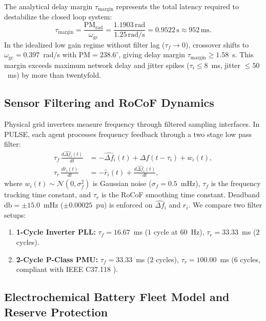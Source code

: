 \documentclass[preprint,12pt]{elsarticle}
\begin{document}
The analytical delay margin $\tau_{\mathrm{margin}}$ represents the total latency required to destabilize the closed loop system:
\begin{equation}
\tau_{\mathrm{margin}} = \frac{\mathrm{PM}_{\mathrm{rad}}}{\omega_{\mathrm{gc}}} = \frac{1.1903\,\mathrm{rad}}{1.25\,\mathrm{rad/s}} = 0.9522\,\mathrm{s} \approx 952\,\mathrm{ms}.
\label{eq:delay_margin_calc}
\end{equation}
In the idealized low gain regime without filter lag ($\tau_f \to 0$), crossover shifts to $\omega_{\mathrm{gc}} = 0.397$~rad/s with $\mathrm{PM} = 238.6^\circ$, giving delay margin $\tau_{\mathrm{margin}} \ge 1.58$~s. This margin exceeds maximum network delay and jitter spikes ($\tau_i \le 8$~ms, jitter $\le 50$~ms) by more than twentyfold.

\subsection{Sensor Filtering and RoCoF Dynamics}
\label{sec:pmu}

Physical grid inverters measure frequency through filtered sampling interfaces. In PULSE, each agent processes frequency feedback through a two stage low pass filter:
\begin{align}
\tau_f\,\frac{d\widehat{\Delta f}_i(t)}{dt} &= -\widehat{\Delta f}_i(t) + \Delta f(t - \tau_i) + w_i(t), \label{eq:pll_f}\\
\tau_r\,\frac{d\widehat{r}_i(t)}{dt} &= -\widehat{r}_i(t) + \frac{d\widehat{\Delta f}_i(t)}{dt}, \label{eq:pll_r}
\end{align}
where $w_i(t) \sim \mathcal{N}(0, \sigma_f^2)$ is Gaussian noise ($\sigma_f = 0.5$~mHz), $\tau_f$ is the frequency tracking time constant, and $\tau_r$ is the RoCoF smoothing time constant. Deadband $\mathrm{db} = \pm 15.0$~mHz ($\pm 0.00025$~pu) is enforced on $\widehat{\Delta f}_i$ and $\widehat{r}_i$. We compare two filter setups:
\begin{enumerate}
    \item \textbf{1-Cycle Inverter PLL:} $\tau_f = 16.67$~ms ($1$ cycle at $60$~Hz), $\tau_r = 33.33$~ms ($2$ cycles).
    \item \textbf{2-Cycle P-Class PMU:} $\tau_f = 33.33$~ms ($2$ cycles), $\tau_r = 100.00$~ms ($6$ cycles, compliant with IEEE C37.118 \cite{ieeec37118}).
\end{enumerate}

\subsection{Electrochemical Battery Fleet Model and Reserve Protection}
\label{sec:battery}
\end{document}

